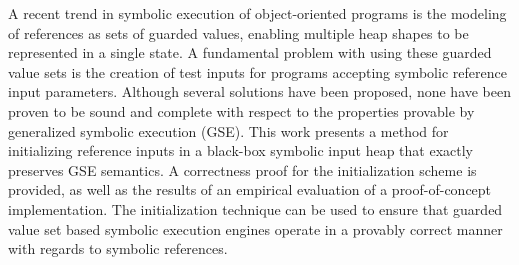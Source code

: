 A recent trend in symbolic execution of object-oriented programs is the modeling of references as sets of guarded values, enabling multiple heap shapes to be represented in a single state. A fundamental problem with using these guarded value sets is the creation of test inputs for programs accepting symbolic reference input parameters. Although several solutions have been proposed, none have been proven to be sound and complete with respect to the properties provable by generalized symbolic execution (GSE). This work presents a method for initializing reference inputs in a black-box symbolic input heap that exactly preserves GSE semantics. A correctness proof for the initialization scheme is provided, as well as the results of an empirical evaluation of a proof-of-concept implementation. The initialization technique can be used to ensure that guarded value set based symbolic execution engines operate in a provably correct manner with regards to symbolic references.



